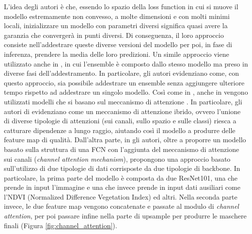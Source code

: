 L'idea degli autori è che, essendo lo spazio della loss function in cui si muove il modello estremamente non convesso, a molte dimensioni e con molti minimi locali, inizializzare un modello con parametri diversi significa quasi avere la garanzia che convergerà in punti diversi. Di conseguenza, il loro approccio consiste nell'addestrare queste diverse versioni del modello per poi, in fase di inferenza, prendere la media delle loro predizioni. Un simile approccio viene utilizzato anche in \cite{shuffling-cnns}, in cui l'ensemble è composto dallo stesso modello ma preso in diverse fasi dell'addestramento. In particolare, gli autori evidenziano come, con questo approccio, sia possibile addestrare un ensemble senza aggiungere ulteriore tempo rispetto ad addestrare un singolo modello. Così come in \cite{rescuenet}, anche in \cite{hybrid-attention, luo2019high} vengono utilizzati modelli che si basano sul meccanismo di attenzione \cite{attention}. In particolare, gli autori  di \cite{hybrid-attention} evidenziano come un meccanismo  di attenzione ibrido, ovvero l'unione di diverse tipologie di attenzioni (sui canali, sullo spazio e sulle classi) riesca a catturare dipendenze a lungo raggio, aiutando così il modello a produrre delle feature map di qualità. Dall'altra parte, in \cite{luo2019high} gli autori, oltre a proporre un modello basato sulla struttura di una FCN con l'aggiunta del meccanismo di attenzione sui canali (\textit{channel attention mechanism}), propongono una approccio basato sull'utilizzo di due tipologie di dati corrisposte da due tipologie di backbone. In particolare, la prima parte del modello è composta da due ResNet101, una che prende in input l'immagine e una che invece prende in input dati ausiliari come l'NDVI (Normalized Difference Vegetation Index) ed altri. Nella seconda parte invece, le due feature map vengono concatenate e passate al modulo di \textit{channel attention}, per poi passare infine nella parte di upsample per produrre le maschere finali (Figura \ref{fig:channel_attention}).

